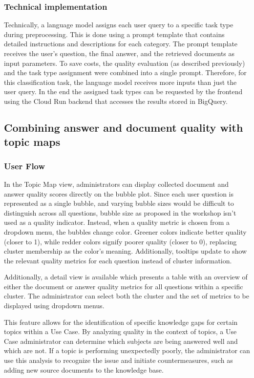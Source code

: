 \documentclass[
	english,
	ruledheaders=section,%
	class=report,%
	thesis={type=bachelor},%
	accentcolor=1b,%
	custommargins=true,%
	marginpar=false,%
	parskip=half-,%
	fontsize=11pt,%
	DIV=14,
]{tudapub}
\begin{document}
\subsubsection{Technical implementation}
Technically, a language model assigns each user query to a specific task type during preprocessing. This is done using a prompt template that contains detailed instructions and descriptions for each category. The prompt template receives the user's question, the final answer, and the retrieved documents as input parameters. To save costs, the quality evaluation (as described previously) and the task type assignment were combined into a single prompt. Therefore, for this classification task, the language model receives more inputs than just the user query. In the end the assigned task types can be requested by the frontend using the Cloud Run backend that accesses the results stored in BigQuery.
\subsection{Combining answer and document quality with topic maps}
\subsubsection{User Flow}
In the Topic Map view, administrators can display collected document and answer quality scores directly on the bubble plot. Since each user question is represented as a single bubble, and varying bubble sizes would be difficult to distinguish across all questions, bubble size as proposed in the workshop isn't used as a quality indicator. Instead, when a quality metric is chosen from a dropdown menu, the bubbles change color. Greener colors indicate better quality (closer to 1), while redder colors signify poorer quality (closer to 0), replacing cluster membership as the color's meaning. Additionally, tooltips update to show the relevant quality metrics for each question instead of cluster information.

Additionally, a detail view is available which presents a table with an overview of either the document or answer quality metrics for all questions within a specific cluster. The administrator can select both the cluster and the set of metrics to be displayed using dropdown menus.

This feature allows for the identification of specific knowledge gaps for certain topics within a Use Case. By analyzing quality in the context of topics, a Use Case administrator can determine which subjects are being answered well and which are not. If a topic is performing unexpectedly poorly, the administrator can use this analysis to recognize the issue and initiate countermeasures, such as adding new source documents to the knowledge base.
\end{document}
